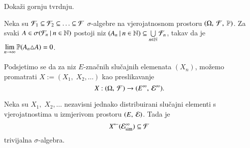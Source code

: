 \begin{nap} %
    Doka\v zi gornju tvrdnju.
\end{nap}

\begin{zad} \label{zad:9.10}
    Neka su $\mathcal{F}_1 \subseteq \mathcal{F}_2 \subseteq \ldots \subseteq \mathcal{F}$ $\sigma$-algebre na vjerojatnosnom prostoru $(\Omega, \: \mathcal{F}, \: \mathbb{P})$.
    Za svaki $A \in \sigma({\mathcal{F}_n} \: | \: {n \in \mathbb{N}})$ postoji niz $({A_n} \: | \: {n \in \mathbb{N}}) \subseteq \bigcup\limits_{n \in \mathbb{N}}^{} \mathcal{F}_n$, takav da je $\lim\limits_{n \to \infty} \mathbb{P}({A_n \triangle A}) = 0$.
\end{zad}

Podsjetimo se da za niz $E$-zna\v cnih slu\v cajnih elemenata $(X_n)$, mo\v zemo promatrati $X:=(X_1, \; X_2, \ldots)$ kao preslikavanje
\begin{equation*}
    X: ({\Omega}, \: {\mathcal{F}}) \to ({E^\infty}, \: {\mathcal{E}^\infty}).
\end{equation*}

\begin{tm}    \label{tm:9.11}
    Neka su $X_1, \; X_2, \ldots$ nezavisni jednako distribuirani slu\v cajni elementi s vjerojatnostima u izmjerivom prostoru $({E}, \: {\mathcal{E}})$.
    Tada je
    \begin{equation*}
        {X}^{\leftarrow}(\mathcal{E}_{\mathrm{sim}}^\infty) \subseteq \mathcal{F}    
    \end{equation*}
    trivijalna $\sigma$-algebra.
\end{tm}

